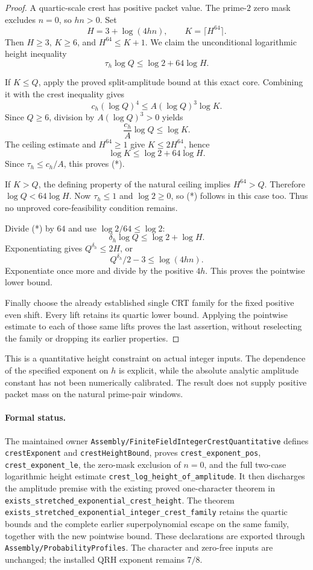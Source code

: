 \documentclass[11pt]{article}
\begin{document}
\begin{proof}
A quartic-scale crest has positive packet value. The prime-\(2\)
zero mask excludes \(n=0\), so \(hn>0\). Set
\[
                  H=3+\log(4hn),\qquad K=\lceil H^{64}\rceil.
\]
Then \(H\geq3\), \(K\geq6\), and \(H^{64}\leq K+1\).
We claim the unconditional logarithmic height inequality
\[
 \tau_h\log Q\leq\log2+64\log H.
 \tag{*}
\]

If \(K\leq Q\), apply the proved split-amplitude bound at this exact
core. Combining it with the crest inequality gives
\[
 c_h(\log Q)^4\leq A(\log Q)^3\log K.
\]
Since \(Q\geq6\), division by \(A(\log Q)^3>0\) yields
\[
                     \frac{c_h}{A}\log Q\leq\log K.
\]
The ceiling estimate and \(H^{64}\geq1\) give
\(K\leq2H^{64}\), hence
\[
                       \log K\leq\log2+64\log H.
\]
Since \(\tau_h\leq c_h/A\), this proves (*).

If \(K>Q\), the defining property of the natural ceiling implies
\(H^{64}>Q\). Therefore \(\log Q<64\log H\). Now
\(\tau_h\leq1\) and \(\log2\geq0\), so (*) follows in this case too.
Thus no unproved core-feasibility condition remains.

Divide (*) by \(64\) and use \(\log2/64\leq\log2\):
\[
                   \delta_h\log Q\leq\log2+\log H.
\]
Exponentiating gives \(Q^{\delta_h}\leq2H\), or
\[
                    Q^{\delta_h}/2-3\leq\log(4hn).
\]
Exponentiate once more and divide by the positive \(4h\). This proves
the pointwise lower bound.

Finally choose the already established single CRT family for the fixed
positive even shift. Every lift retains its quartic lower bound.
Applying the pointwise estimate to each of those same lifts proves the
last assertion, without reselecting the family or dropping its earlier
properties.
\end{proof}

This is a quantitative height constraint on actual integer inputs.
The dependence of the specified exponent on \(h\) is explicit, while
the absolute analytic amplitude constant has not been numerically
calibrated. The result does not supply positive packet mass on the
natural prime-pair windows.

\paragraph{Formal status.}
The maintained owner
\texttt{Assembly/FiniteFieldIntegerCrestQuantitative} defines
\texttt{crestExponent} and \texttt{crestHeightBound}, proves
\texttt{crest\_exponent\_pos}, \texttt{crest\_exponent\_le},
the zero-mask exclusion of \(n=0\), and the full two-case logarithmic
height estimate
\texttt{crest\_log\_height\_of\_amplitude}.
It then discharges the amplitude premise with the existing proved
one-character theorem in
\texttt{exists\_stretched\_exponential\_crest\_height}.
The theorem
\texttt{exists\_stretched\_exponential\_integer\_crest\_family}
retains the quartic bounds and the complete earlier superpolynomial
escape on the same family, together with the new pointwise bound.
These declarations are exported through
\texttt{Assembly/ProbabilityProfiles}.
The character and zero-free inputs are unchanged; the installed QRH
exponent remains \(7/8\).
\end{document}

